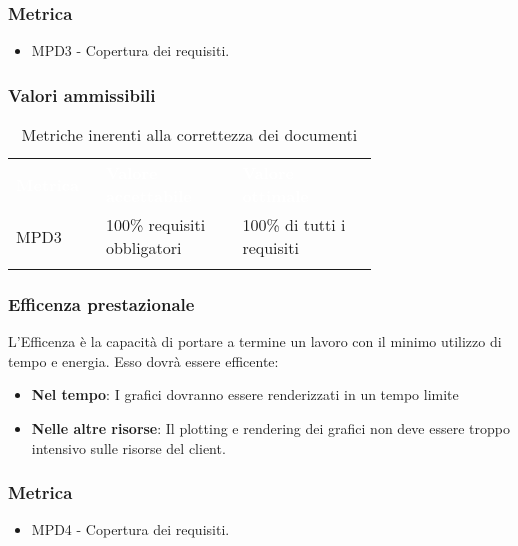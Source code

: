 \subsubsection{Metrica}
\begin{itemize}
    \item MPD3 - Copertura dei requisiti.
\end{itemize}
\subsubsection{Valori ammissibili}
\renewcommand{\arraystretch}{1.5}
\begin{longtable}{p{0.12\linewidth}p{0.30\linewidth}p{0.30\linewidth}}
	\rowcolor[RGB]{33, 73, 50}
	\textcolor{white}{\textbf{Metrica}} & \textcolor{white}{\textbf{Valore accettabile}} & \textcolor{white}{\textbf{Valore ottimale}}\\
    \rowcolor[RGB]{233, 245, 206}
    MPD3 & 100\% requisiti obbligatori & 100\% di tutti i requisiti\\ 
    \caption{Metriche inerenti alla correttezza dei documenti}
\end{longtable}	
\subsubsection{Efficenza prestazionale}
L'Efficenza è la capacità di portare a termine un lavoro con il minimo utilizzo di tempo e energia. Esso dovrà essere efficente:
\begin{itemize}
    \item \textbf{Nel tempo}: I grafici dovranno essere renderizzati in un tempo limite
    \item \textbf{Nelle altre risorse}: Il plotting e rendering dei grafici non deve essere troppo intensivo sulle risorse del client.
\end{itemize}    
\subsubsection{Metrica}
\begin{itemize}
    \item MPD4 - Copertura dei requisiti.
\end{itemize}
